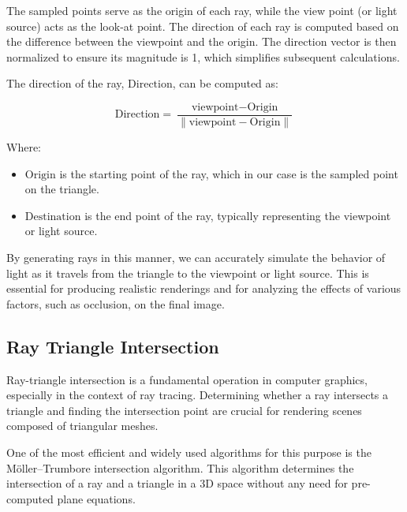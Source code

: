 \documentclass[11pt, a4paper,oneside,chapterprefix=false]{scrbook}
\begin{document}
\vspace{10pt}
The sampled points serve as the origin of each ray, while the view point (or light source) acts as the look-at point. The direction of each ray is computed based on the difference between the viewpoint and the origin. The direction vector is then normalized to ensure its magnitude is 1, which simplifies subsequent calculations.

\vspace{10pt}

The direction of the ray, \( \text{Direction} \), can be computed as:

\begin{equation}
	\text{Direction} = \frac{\text{viewpoint} - \text{Origin}}{\|\text{viewpoint} - \text{Origin}\|}
\end{equation}

Where:
\begin{itemize}
    \item \(\text{Origin}\) is the starting point of the ray, which in our case is the sampled point on the triangle.
    \item \(\text{Destination}\) is the end point of the ray, typically representing the viewpoint or light source.
\end{itemize}

By generating rays in this manner, we can accurately simulate the behavior of light as it travels from the triangle to the viewpoint or light source. This is essential for producing realistic renderings and for analyzing the effects of various factors, such as occlusion, on the final image.


\subsection{Ray Triangle Intersection}

Ray-triangle intersection is a fundamental operation in computer graphics, especially in the context of ray tracing. Determining whether a ray intersects a triangle and finding the intersection point are crucial for rendering scenes composed of triangular meshes.

\vspace{10pt}

One of the most efficient and widely used algorithms for this purpose is the Möller–Trumbore intersection algorithm. This algorithm determines the intersection of a ray and a triangle in a 3D space without any need for pre-computed plane equations.
\end{document}
